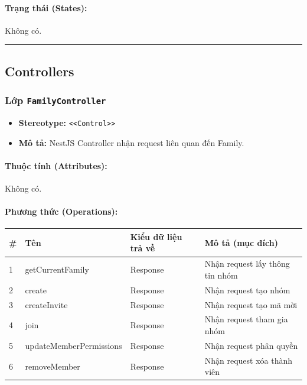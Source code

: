 \documentclass[12pt,a4paper]{article}
\begin{document}
\paragraph{Trạng thái (States):}
Không có.

\vskip 0.5cm
\noindent\rule{\textwidth}{0.5pt}
\vskip 0.5cm

\subsection{Controllers}

\subsubsection{Lớp \texttt{FamilyController}}
\begin{itemize}[leftmargin=*]
    \item \textbf{Stereotype:} \texttt{\textless{}\textless{}Control\textgreater{}\textgreater{}}
    \item \textbf{Mô tả:} NestJS Controller nhận request liên quan đến Family.
\end{itemize}

\paragraph{Thuộc tính (Attributes):}
Không có.

\paragraph{Phương thức (Operations):}
\begin{longtable}{|p{0.6cm}|p{3.8cm}|p{2.6cm}|p{6.5cm}|}
\hline
\textbf{\#} & \textbf{Tên} & \textbf{Kiểu dữ liệu trả về} & \textbf{Mô tả (mục đích)} \\ \hline
\endhead
1 & getCurrentFamily & Response & Nhận request lấy thông tin nhóm \\ \hline
2 & create & Response & Nhận request tạo nhóm \\ \hline
3 & createInvite & Response & Nhận request tạo mã mời \\ \hline
4 & join & Response & Nhận request tham gia nhóm \\ \hline
5 & updateMemberPermissions & Response & Nhận request phân quyền \\ \hline
6 & removeMember & Response & Nhận request xóa thành viên \\ \hline
\end{longtable}
\end{document}
